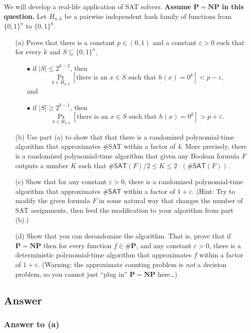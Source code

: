 \documentclass{article}
\renewcommand{\P}{\mathbf{P}}
\newcommand{\NP}{\mathbf{NP}}
\def \eps {{\varepsilon}}
\begin{document}
We will develop a real-life application of SAT solvers.
{\bf Assume $\mathbf{P}=\mathbf{NP}$ in this question.} Let $H_{n,k}$ be a pairwise independent hash family of functions from $\{0,1\}^n$ to $\{0,1\}^k$.
\begin{itemize}
	\item[(a)] Prove that there is a constant $p \in (0,1)$ and a constant $\eps > 0$ such that for every $k$ and  $S \subseteq \{0,1\}^n$, 
	
	\begin{itemize} 
	\item[$\bullet$] if $|S| \leq 2^{k-2}$, then \[\Pr_{h \in H_{n,k}}[\text{there is an $x \in S$ such that $h(x) = 0^k$}] < p - \eps,\] and
	\item[$\bullet$] if $|S| \geq 2^{k-1}$, then \[\Pr_{h \in H_{n,k}}[\text{there is an $x \in S$ such that $h(x) = 0^k$}] > p + \eps.\] 
\end{itemize}
		\item[(b)]
		Use part (a) to show that that there is a randomized polynomial-time algorithm that approximates \#\textsf{SAT} within a factor of 4. More precisely, there is a randomized polynomial-time algorithm that given any Boolean formula $F$ outputs a number $K$ such that $\#\textsf{SAT}(F)/2 \leq K \leq 2\cdot \left(\#\textsf{SAT}(F)\right)$.
	\item[(c)]
	Show that for any constant $\varepsilon>0$, there is a randomized polynomial-time algorithm that approximates $\#\textsf{SAT}$ within a factor of $1+\varepsilon$. (Hint: Try to modify the given formula $F$ in some natural way that changes the number of SAT assignments, then feed the modification to your algorithm from part (b).)
	\item[(d)]
		Show that you can derandomize the algorithm.	That is, prove that if $\P = \NP$ then for every function $f\in \#\mathbf{P}$, and any constant $\varepsilon>0$, there is a deterministic polynomial-time algorithm that approximates $f$ within a factor of $1+\varepsilon$. (Warning: the approximate counting problem is \emph{not} a decision problem, so you cannot just ``plug in'' $\P = \NP$ here\dots)
\end{itemize}

\subsection*{Answer}
\subsubsection*{Answer to (a)}
\end{document}
